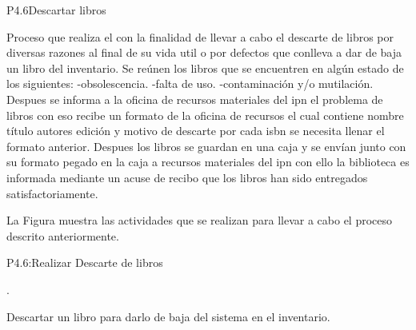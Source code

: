 
\begin{Proceso}{P4.6}{Descartar libros } {
  

  Proceso que realiza el  con la finalidad de llevar a cabo el descarte de libros por diversas razones al final de su vida util o por defectos que conlleva a dar de baja un libro del inventario.
  Se reúnen los libros que se encuentren en algún estado de los siguientes:
  -obsolescencia.
  -falta de uso.
  -contaminación y/o mutilación.
Despues se informa a la oficina de recursos materiales del ipn el problema de libros con eso recibe un formato de la oficina de recursos el cual contiene nombre título autores edición y motivo de descarte por cada isbn se necesita llenar el formato anterior.
Despues los libros se guardan en una caja y se envían junto con su formato pegado en la caja a recursos materiales del ipn con ello la biblioteca  es informada mediante un acuse de recibo que los libros han sido entregados satisfactoriamente.




  \noindent La Figura  muestra las actividades que se realizan para llevar a cabo el proceso descrito anteriormente.


} {P4.6:Realizar Descarte de libros}


   { %
     .
  }

   { %
	Descartar un libro para darlo de baja del sistema en el inventario.
  }


\end{Proceso}
